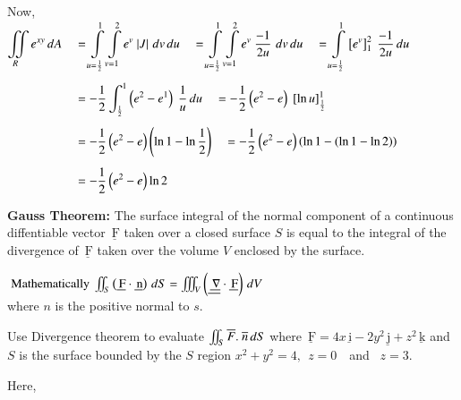 \documentclass[11pt]{extarticle}
\renewcommand{\vec}[1]{\underline{\,\mathrm{#1}}}
\newcommand{\du}{{\,du}}
\newcommand{\dv}{{\,dv}}
\newcommand{\dS}{{\,dS}}
\let\oldnabla\nabla
\renewcommand{\nabla}{\vec{\oldnabla}}
\newcommand{\mint}{\int\displaylimits}
\newcommand{\miint}{\iint\displaylimits}
\newcommand{\miiint}{\iiint\displaylimits}
\begin{document}
\vspace{2ex}
Now,\\
$\begin{aligned}
\miint_R e^{x y} \,dA
\quad & =\mint_{u=\frac{1}{2}}^1 \mint_{v=1}^2 e^v \ |J| \,\dv\du
\quad =\mint_{u=\frac{1}{2}}^1 \mint_{v=1}^2 e^v \ \frac{-1}{2u} \,\dv\du
\quad =\mint_{u=\frac{1}{2}}^1 \left[e^v\right]_1^2 \ \frac{-1}{2u} \du \\[1ex]
& =-\frac{1}{2} \int_{\frac{1}{2}}^1\left(e^2-e^1\right) \ \frac{1}{u}\du
\quad = -\frac{1}{2}\left(e^2-e\right) \ [\ln u]_{\frac{1}{2}}^1 \\[1ex]
& =-\frac{1}{2}\left(e^2-e\right)\left(\ln 1-\ln \frac{1}{2}\right)
\quad =-\frac{1}{2}\left(e^2-e\right)\left(\ln 1- (\ln 1 - \ln 2)\right)\\[1ex]
& =-\frac{1}{2}\left(e^2-e\right) \ln{2}
\end{aligned}$


\pagebreak
{}
\textbf{Gauss Theorem:} The surface integral of the normal component of a continuous diffentiable vector $\vec{F}$ taken over a closed surface $S$ is equal to the integral of the divergence of $\vec{F}$ taken over the volume $V$ enclosed by the surface.

\vspace{-\baselineskip}
\begin{center}
   $\text { Mathematically } \miint_S \left(\vec{F} \cdot \vec{n}\right) \dS =\miiint_V \left(\nabla \cdot \vec{F}\right) \,dV$\\[1.5ex]
   where $n$ is the positive normal to $s$.
\end{center}


\textbf{} Use Divergence theorem to evaluate
$ \miint_S \overline{F}.\ \overline{n} \dS$ where $\vec{F} = 4x\vec{i} - 2y^2 \vec{j}+ z^2 \vec{k}$ and $S$ is the surface bounded by the
$S$ region $x^2+y^2=4,\ \ z=0$\ \ and \ $z=3$.




Here,\\[1ex]
\end{document}

